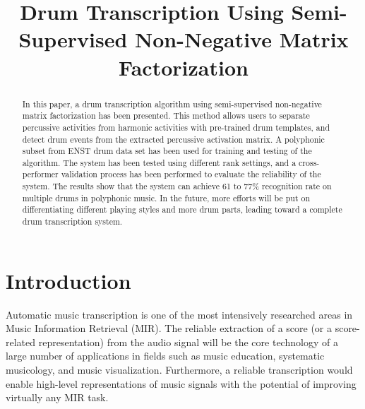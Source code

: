 \documentclass{article}
\title{Drum Transcription Using Semi-Supervised Non-Negative Matrix Factorization}
\begin{document}
%
\maketitle
%
\begin{abstract}
In this paper, a drum transcription algorithm using semi-supervised non-negative matrix factorization has been presented. This method allows users to separate percussive activities from harmonic activities with pre-trained drum templates, and detect drum events from the extracted percussive activation matrix. A polyphonic subset from ENST drum data set has been used for training and testing of the algorithm. The system has been tested using different rank settings, and a cross-performer validation process has been performed to evaluate the reliability of the system.  The results show that the system can achieve 61 to 77\% recognition rate on multiple drums in polyphonic music. In the future, more efforts will be put on differentiating different playing styles and more drum parts, leading toward a complete drum transcription system.

\end{abstract}
%

\section{Introduction}\label{sec:introduction}
Automatic music transcription is one of the most intensively researched areas in Music Information Retrieval (MIR). The reliable extraction of a score (or a score-related representation) from the audio signal will be the core technology of a large number of applications in fields such as music education, systematic musicology, and music visualization. Furthermore, a reliable transcription would enable high-level representations of music signals with the potential of improving virtually any MIR task.

\end{document}
